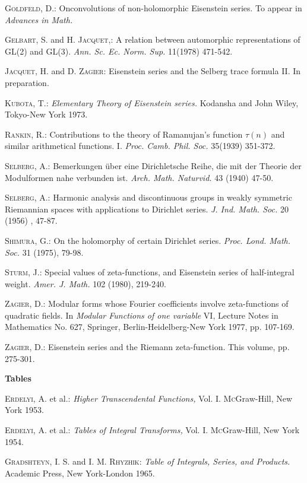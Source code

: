 \begin{thebibliography}{99}
 \textsc{Goldfeld, D.:} On\pageoriginale convolutions of non-holomorphic Eisenstein series. To appear in \textit{Advances in Math.}

 \textsc{Gelbart, S.} and \textsc{H. Jacquet,:} A relation between automorphic representations of GL(2) and GL(3). \textit{Ann. Sc. Ec. Norm. Sup.} 11(1978) 471-542.

 \textsc{Jacquet, H.} and \textsc{D. Zagier:} Eisenstein series and the Selberg trace formula II. In preparation.

 \textsc{Kubota, T.:} \textit{Elementary Theory of Eisenstein series.} Kodansha and John Wiley, Tokyo-New York 1973.

 \textsc{Rankin, R.:} Contributions to the theory of Ramanujan's function $\tau(n)$ and similar arithmetical functions. I. \textit{Proc. Camb. Phil. Soc.} 35(1939) 351-372.

 \textsc{Selberg, A.:} Bemerkungen \"uber eine Dirichletsche Reihe, die mit der Theorie der Modulformen nahe verbunden ist. \textit{Arch. Math. Naturvid.} 43 (1940) 47-50.

 \textsc{Selberg, A.:} Harmonic analysis and discontinuous groups in weakly symmetric Riemannian spaces with applications to Dirichlet series. \textit{J. Ind. Math. Soc.} 20 (1956) , 47-87.

 \textsc{Shimura, G.:} On the holomorphy of certain Dirichlet series. \textit{Proc. Lond. Math. Soc.} 31 (1975), 79-98.

 \textsc{Sturm, J.:} Special values of zeta-functions, and Eisenstein series of half-integral weight. \textit{Amer. J. Math.} 102 (1980), 219-240.

 \textsc{Zagier, D.:} Modular forms whose Fourier coefficients involve zeta-functions of quadratic fields. In \textit{Modular Functions of one variable} VI, Lecture Notes in Mathematics No. 627, Springer, Berlin-Heidelberg-New York 1977, pp. 107-169. 

 \textsc{Zagier, D.:} Eisenstein series and the Riemann zeta-function. This volume, pp. 275-301.

\begin{center}
\textbf{Tables}
\end{center}

 \textsc{Erdelyi, A.} et al.: \textit{Higher Transcendental Functions,} Vol. I. \textsc{Mc}Graw-Hill, New York 1953.

 \textsc{Erdelyi, A.} et al.: \textit{Tables of Integral Transforms,} Vol. I. \textsc{Mc}Graw-Hill, New York 1954.

 \textsc{Gradshteyn, I. S.} and \textsc{I. M. Rhyzhik:} \textit{Table of Integrals, Series, and Products.} Academic Press, New York-London 1965.
\end{thebibliography}

